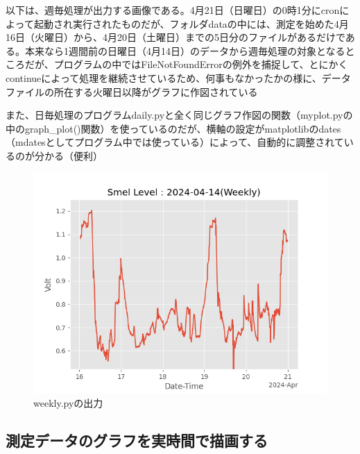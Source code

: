 \documentclass[12pt,a4paper,uplatex]{jsarticle}
\begin{document}
\newpage

以下は、週毎処理が出力する画像である。4月21日（日曜日）の0時1分にcronによって起動され実行されたものだが、フォルダdataの中には、測定を始めた4月16日（火曜日）から、4月20日（土曜日）までの5日分のファイルがあるだけである。本来なら1週間前の日曜日（4月14日）のデータから週毎処理の対象となるところだが、プログラムの中ではFileNotFoundErrorの例外を捕捉して、とにかくcontinueによって処理を継続させているため、何事もなかったかの様に、データファイルの所在する火曜日以降がグラフに作図されている

また、日毎処理のプログラムdaily.pyと全く同じグラフ作図の関数（myplot.pyの中のgraph\_plot()関数）を使っているのだが、横軸の設定がmatplotlibのdates（mdatesとしてプログラム中では使っている）によって、自動的に調整されているのが分かる（便利）

\begin{figure}[htbp]
	\begin{minipage}[b]{1.0\linewidth}
		\centering
		\includegraphics[keepaspectratio, scale=0.8]{figs/png/Weekly_2024-04-14.png}
		\caption{weekly.pyの出力}
	\end{minipage}
\end{figure}


\subsection{測定データのグラフを実時間で描画する}
\end{document}
